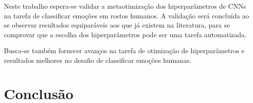 \documentclass[
12pt,				%
openright,			%
oneside,			%
a4paper,			%
english,			%
french,				%
spanish,			%
brazil				%
]{abntex2}
\begin{document}
Neste trabalho espera-se validar a metaotimização dos hiperparâmetros de CNNs na tarefa de classificar emoções em rostos humanos. A validação será concluída ao se observar resultados equiparáveis aos que já existem na literatura, para se comprovar que a escolha dos hiperparâmetros pode ser uma tarefa automatizada.

Busca-se também fornecer avanços na tarefa de otimização de hiperparâmetros e resultados melhores no desafio de classificar emoções humanas.



\chapter{Conclusão}


\postextual


\end{document}
